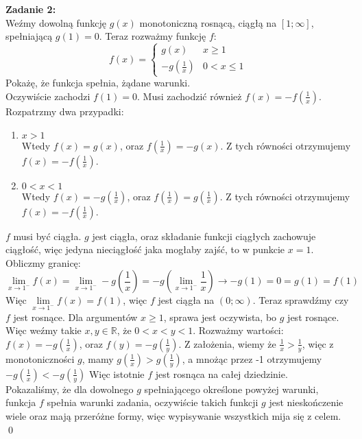 \documentclass[10pt]{article}
\newcommand{\R}{\mathbb{R}}
\begin{document}
\vspace{80pt}

\textbf{Zadanie 2:} \\[10pt]
Weźmy dowolną funkcję $g(x)$ monotoniczną rosnącą, ciągłą na $[1; \infty]$, spełniającą $g(1) = 0$.
Teraz rozważmy funkcję $f$:
$$f(x) = \begin{cases}
    g(x) & x \geq 1 \\
    -g(\frac{1}{x}) & 0 < x \leq 1
\end{cases}$$
Pokażę, że funkcja spełnia, żądane warunki. \\[5pt]
Oczywiście zachodzi $f(1) = 0$. Musi zachodzić również $f(x) = -f(\frac{1}{x})$. Rozpatrzmy dwa przypadki:
\begin{enumerate}[(1)]
    \item $x > 1$ \\[5pt]
    Wtedy $f(x) = g(x)$, oraz $f(\frac{1}{x}) = -g(x)$. Z tych równości otrzymujemy $f(x) = -f(\frac{1}{x})$.

    \item $0 < x < 1$ \\[5pt]
    Wtedy $f(x) = -g(\frac{1}{x})$, oraz $f(\frac{1}{x}) = g(\frac{1}{x})$. Z tych równości otrzymujemy $f(x) = -f(\frac{1}{x})$.
\end{enumerate}
$f$ musi być ciągła. $g$ jest ciągła, oraz składanie funkcji ciągłych zachowuje ciągłość, więc jedyna nieciągłość jaka mogłaby zajść, to w punkcie $x = 1$. Obliczmy granicę:
$$\lim_{x \to 1^-} f(x) = \lim_{x \to 1^-} -g\left(\frac{1}{x}\right) = -g\left(\lim_{x \to 1^-} \frac{1}{x}\right) \to -g(1) = 0 = g(1) = f(1)$$
Więc $\lim\limits_{x \to 1^-} f(x) = f(1)$, więc $f$ jest ciągła na $(0; \infty)$. Teraz sprawdźmy czy $f$ jest rosnące. Dla argumentów $x \geq 1$, sprawa jest oczywista, bo $g$ jest rosnące. Więc weźmy takie $x, y \in \R$, że $0 < x < y < 1$. Rozważmy wartości: $f(x) = -g(\frac{1}{x})$, oraz $f(y) = -g(\frac{1}{y})$. Z założenia, wiemy że $\frac{1}{x} > \frac{1}{y}$, więc z monotoniczności $g$, mamy $g(\frac{1}{x}) > g(\frac{1}{y})$, a mnożąc przez -1 otrzymujemy $-g(\frac{1}{x}) < -g(\frac{1}{y})$ Więc istotnie $f$ jest rosnąca na całej dziedzinie. \\[5pt]
Pokazaliśmy, że dla dowolnego $g$ spełniającego określone powyżej warunki, funkcja $f$ spełnia warunki zadania, oczywiście takich funkcji $g$ jest nieskończenie wiele oraz mają przeróżne formy, więc wypisywanie wszystkich mija się z celem. \qed

\vspace{20pt}
\end{document}
